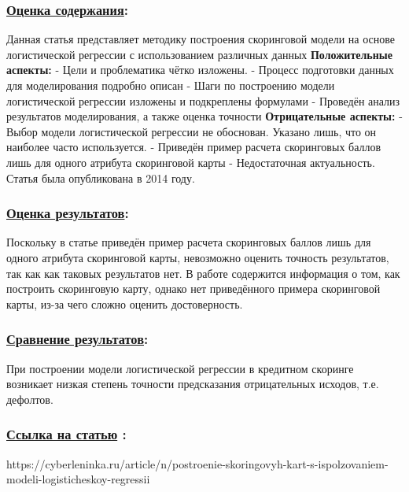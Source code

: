 \documentclass[a4paper,14pt]{article}
\begin{document}
\subsubsection*{\underline{Оценка содержания}:}
Данная статья представляет методику построения скоринговой модели на основе логистической регрессии с использованием различных данных\newline
\textbf{Положительные аспекты:} \newline
- Цели и проблематика чётко изложены. \newline
- Процесс подготовки данных для моделирования подробно описан \newline
- Шаги по построению модели логистической регрессии изложены и подкреплены формулами \newline
- Проведён анализ результатов моделирования, а также оценка точности \vspace{10pt} \newline
\textbf{Отрицательные аспекты:} \newline
- Выбор модели логистической регрессии не обоснован. Указано лишь, что он наиболее часто используется. \newline
- Приведён пример расчета скоринговых баллов лишь для одного атрибута скоринговой карты \newline
- Недостаточная актуальность. Статья была опубликована в 2014 году. \newline
\subsubsection*{\underline{Оценка результатов}:}
Поскольку в статье приведён пример расчета скоринговых баллов лишь для одного атрибута скоринговой карты, невозможно оценить точность результатов, так как как таковых результатов нет. В работе содержится информация о том, как построить скоринговую карту, однако нет приведённого примера скоринговой карты, из-за чего сложно оценить достоверность.
\subsubsection*{\underline{Сравнение результатов}:}
При построении модели логистической регрессии в кредитном скоринге возникает низкая степень точности предсказания отрицательных исходов, т.е. дефолтов.
\subsubsection*{\underline{Ссылка на статью} :}
https://cyberleninka.ru/article/n/postroenie-skoringovyh-kart-s-ispolzovaniem-modeli-logisticheskoy-regressii
\end{document}
